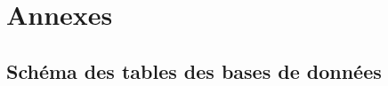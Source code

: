 \documentclass[12pt]{article}
\begin{document}
\section{Annexes}

\subsection{Schéma des tables des bases de données}
\end{document}
